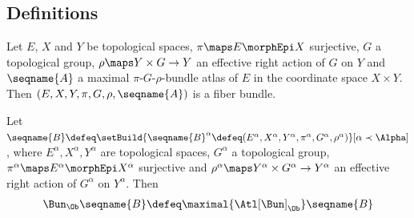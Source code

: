 \documentclass{article}
\begin{document}
\subsection{Definitions}
\begin{definition}
\label{def:Bun}
Let $E$, $X$ and $Y$ be topological spaces, $\pi \maps E \morphEpi X$ surjective,
$G$ a topological group,
$\rho \maps Y \times G \to Y$ an effective right action of
$G$ on $Y$ and $\seqname{A}$
a maximal $\pi$-$G$-$\rho$-bundle atlas of $E$ in the coordinate space $X \times Y$.
Then $(E, X, Y, \pi, G, \rho, \seqname{A})$ is a fiber bundle.

Let
$
  \seqname{B}
  \defeq
  \setBuild
    {{
      \seqname{B}^\alpha \defeq
      (
        E^\alpha,
        X^\alpha,
        Y^\alpha,
        \pi^\alpha,
        G^\alpha,
        \rho^\alpha
      )
    }}%
    [
      \alpha \prec \Alpha
    ]
$,
where $E^\alpha, X^\alpha, Y^\alpha$ are topological spaces,
$G^\alpha$ a topological group,
$\pi^\alpha \maps E^\alpha \morphEpi X^\alpha$ surjective and
$\rho^\alpha \maps Y^\alpha \times G^\alpha \to Y^\alpha$
an effective right action of $G^\alpha$ on $Y^\alpha$. Then
\begin{multline}
\Bun_\Ob \seqname{B} \defeq \maximal{\Atl[\Bun]_\Ob} \seqname{B}
\end{multline}
\end{definition}
\end{document}
